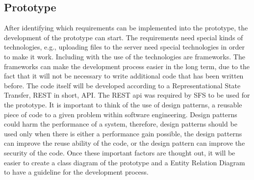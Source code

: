 \documentclass[paper=a4, fontsize=11pt,twoside]{scrartcl}	%
\begin{document}



\newpage
\subsection{Prototype}
After identifying which requirements can be implemented into the prototype, the development of the prototype can start. The requirements need special kinds of technologies, e.g., uploading files to the server need special technologies in order to make it work. Including with the use of the technologies are frameworks. The frameworks can make the development process easier in the long term, due to the fact that it will not be necessary to write additional code that has been written before. The code itself will be developed according to a Representational State Transfer, REST in short, API. The REST api was required by SFS to be used for the prototype. It is important to think of the use of design patterns, a reusable piece of code to a given problem within software engineering. Design patterns could harm the performance of a system, therefore, design patterns should be used only when there is either a performance gain possible, the design patterns can improve the reuse ability of the code, or the design pattern can improve the security of the code. Once these important factors are thought out, it will be easier to create a class diagram of the prototype and a Entity Relation Diagram to have a guideline for the development process. \\ 
\end{document}

